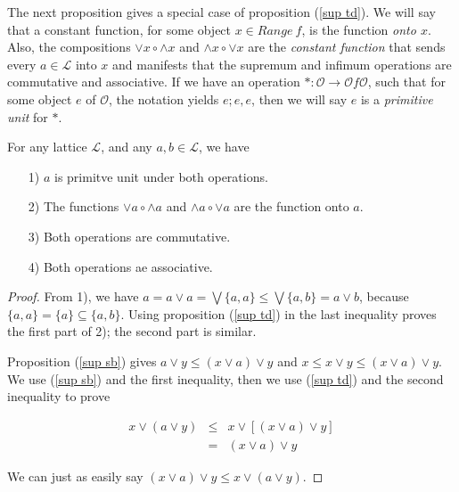 \documentclass [12pt]{book}
\begin{document}
The next proposition gives a special case of proposition (\ref{sup td}). We will say that a constant function, for some object $x\in Range~f$, is the function \textit{onto $x$}. Also, the compositions $\vee x\circ\wedge x$ and $\wedge x\circ\vee x$ are the \textit{constant function} that sends every $a\in\mathcal L$ into $x$ and manifests that the supremum and infimum operations are commutative and associative.  If we have an operation $*:\mathcal{O}\rightarrow\mathcal{O}f\mathcal{O}$, such that for some object $e$ of $\mathcal{O}$, the notation yields $e;e,e$, then we will say $e$ is a \textit{primitive unit} for $*$.

\begin{proposition}\label{sup alg}For any lattice $\mathcal L$, and any $a,b\in\mathcal L$, we have

\begin{itemize}\item[1)]$a$ is primitve unit under both operations.

\item[2)]The functions $\vee a\circ\wedge a$ and $\wedge a\circ\vee a$ are the function onto $a$.

\item[3)]Both operations are commutative.

\item[4)]Both operations ae associative.

\end{itemize}

\end{proposition}

\begin{proof}

From 1), we have $a=a\vee a=\bigvee\{a,a\}\leq\bigvee\{a,b\}=a\vee b$, because $\{a,a\}=\{a\}\subseteq\{a,b\}$. Using proposition (\ref{sup td}) in the last inequality proves the first part of 2); the second part is similar.

Proposition (\ref{sup sb}) gives $a\vee y\leq(x\vee a)\vee y$ and $x\leq x\vee y\leq(x\vee a)\vee y$. We use (\ref{sup sb}) and the first inequality, then we use (\ref{sup td}) and the second inequality to prove

\begin{eqnarray}\nonumber x\vee(a\vee y)&\leq&x\vee[(x\vee a)\vee y]\\\nonumber&=&(x\vee a)\vee y\end{eqnarray}

We can just as easily say $(x\vee a)\vee y\leq x\vee(a\vee y)$.
\end{proof}
\end{document}
